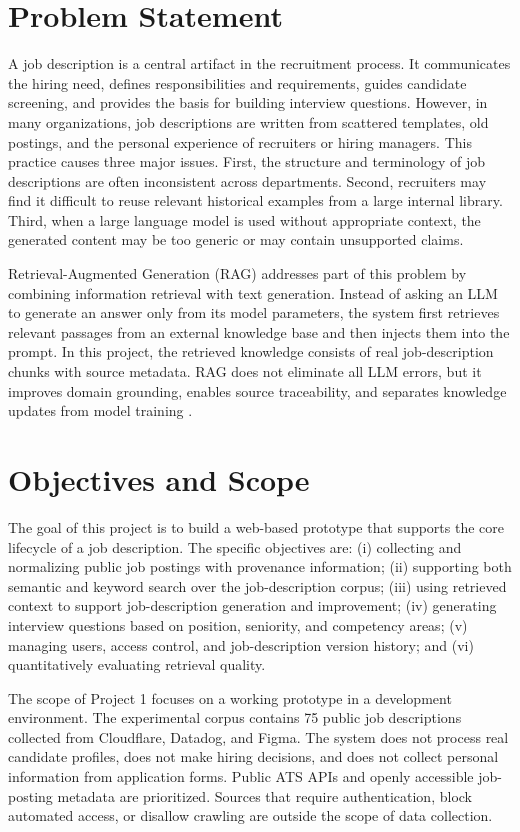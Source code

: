 \documentclass[12pt,a4paper,oneside]{report}
\begin{document}
\section{Problem Statement}
A job description is a central artifact in the recruitment process. It communicates the hiring need, defines responsibilities and requirements, guides candidate screening, and provides the basis for building interview questions. However, in many organizations, job descriptions are written from scattered templates, old postings, and the personal experience of recruiters or hiring managers. This practice causes three major issues. First, the structure and terminology of job descriptions are often inconsistent across departments. Second, recruiters may find it difficult to reuse relevant historical examples from a large internal library. Third, when a large language model is used without appropriate context, the generated content may be too generic or may contain unsupported claims.

Retrieval-Augmented Generation (RAG) addresses part of this problem by combining information retrieval with text generation. Instead of asking an LLM to generate an answer only from its model parameters, the system first retrieves relevant passages from an external knowledge base and then injects them into the prompt. In this project, the retrieved knowledge consists of real job-description chunks with source metadata. RAG does not eliminate all LLM errors, but it improves domain grounding, enables source traceability, and separates knowledge updates from model training \cite{lewis2020rag}.

\section{Objectives and Scope}
The goal of this project is to build a web-based prototype that supports the core lifecycle of a job description. The specific objectives are: (i) collecting and normalizing public job postings with provenance information; (ii) supporting both semantic and keyword search over the job-description corpus; (iii) using retrieved context to support job-description generation and improvement; (iv) generating interview questions based on position, seniority, and competency areas; (v) managing users, access control, and job-description version history; and (vi) quantitatively evaluating retrieval quality.

The scope of Project 1 focuses on a working prototype in a development environment. The experimental corpus contains 75 public job descriptions collected from Cloudflare, Datadog, and Figma. The system does not process real candidate profiles, does not make hiring decisions, and does not collect personal information from application forms. Public ATS APIs and openly accessible job-posting metadata are prioritized. Sources that require authentication, block automated access, or disallow crawling are outside the scope of data collection.
\end{document}
